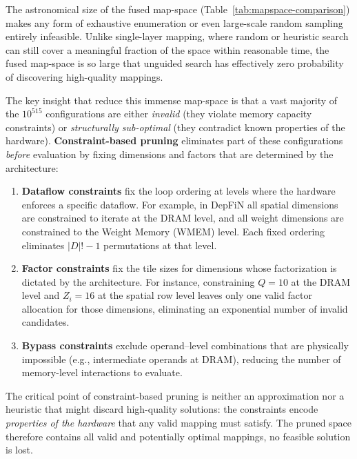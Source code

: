 The astronomical size of the fused map-space
(Table~\ref{tab:mapspace-comparison}) makes any form of exhaustive
enumeration or even large-scale random sampling entirely infeasible.
Unlike single-layer mapping, where random or heuristic search can
still cover a meaningful fraction of the space within reasonable
time, the fused map-space is so large that unguided search has
effectively zero probability of discovering high-quality mappings.

The key insight that reduce this immense map-space is that a vast
majority of the $10^{515}$ configurations are either \emph{invalid}
(they violate memory capacity constraints) or \emph{structurally
sub-optimal} (they contradict known properties of the hardware).
\textbf{Constraint-based pruning} eliminates part of these configurations
\emph{before} evaluation by fixing dimensions and factors that are
determined by the architecture:

\begin{enumerate}
  \item \textbf{Dataflow constraints} fix the loop ordering at levels
        where the hardware enforces a specific dataflow.
        For example, in DepFiN all spatial dimensions are constrained
        to iterate at the DRAM level, and all weight dimensions are
        constrained to the Weight Memory (WMEM) level.
        Each fixed ordering eliminates $|D|! - 1$ permutations at that
        level.

  \item \textbf{Factor constraints} fix the tile sizes for dimensions
        whose factorization is dictated by the architecture.
        For instance, constraining $Q = 10$ at the DRAM level and
        $Z_i = 16$ at the spatial row level leaves only one valid
        factor allocation for those dimensions, eliminating an
        exponential number of invalid candidates.

  \item \textbf{Bypass constraints} exclude operand--level
        combinations that are physically impossible (e.g.,
        intermediate operands at DRAM), reducing the number of
        memory-level interactions to evaluate.
\end{enumerate}


The critical point of constraint-based pruning is neither an
approximation nor a heuristic that might discard high-quality solutions: the
constraints encode \emph{properties of the hardware} that any valid
mapping must satisfy.
The pruned space therefore contains all valid and potentially
optimal mappings, no feasible solution is lost.